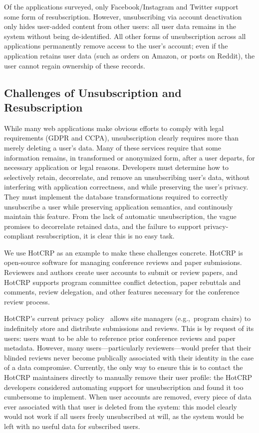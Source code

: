 Of the applications surveyed, only Facebook/Instagram and Twitter support some form of
resubscription. However, unsubscribing via account deactivation only hides user-added content from
other users: all user data remains in the system without being de-identified.  All other forms of
unsubscription across all applications permanently remove access to the user's account; even if the
application retains user data (such as orders on Amazon, or posts on Reddit), the user cannot regain
ownership of these records.

\subsection{Challenges of Unsubscription and Resubscription}
While many web applications make obvious efforts to comply with legal requirements (GDPR and CCPA),
unsubscription clearly requires more than merely deleting a user's data. Many of these services
require that some information remains, in transformed or anonymized form, after a user departs, for
necessary application or legal reasons. 
%
Developers must determine how to selectively retain, decorrelate, and remove an unsubscribing user's data,
without interfering with application correctness, and while preserving the user's privacy. They must 
implement the database transformations required to correctly unsubscribe a user while
preserving application semantics, and continously maintain this feature. 
%
From the lack of automatic unsubscription, the vague promises to decorrelate retained data, and the
failure to support privacy-compliant resubscription, it is clear this is no easy task.
%

We use HotCRP as an example to make these challenges concrete. HotCRP is open-source software for
managing conference reviews and paper submissions.  Reviewers and authors create user accounts to
submit or review papers, and HotCRP supports program committee conflict detection, paper rebuttals
and comments, review delegation, and other features necessary for the conference review process.

HotCRP's current privacy policy~\cite{hotcrp:privacy} allows site managers (e.g.,\ program chairs)
to indefinitely store and distribute submissions and reviews.  This is by request of its users:
users want to be able to reference prior conference reviews and paper metadata.  However, many
users---particularly reviewers---would prefer that their blinded reviews never become publically
associated with their identity in the case of a data compromise. Currently, the only way to ensure
this is to contact the HotCRP maintainers directly to manually remove their user profile: the HotCRP
developers considered automating support for unsubscription and found it too cumbersome to
implement. 
%
%
When user accounts are removed, every piece of data ever associated with that
user is deleted from the system: this model clearly would not work if all users freely
unsubscribed at will, as the system would be left with no useful data for subscribed users.

